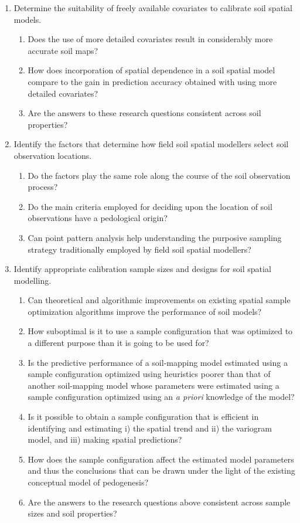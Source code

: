\begin{enumerate}
 \item Determine the suitability of freely available covariates to calibrate soil spatial models.
  \begin{enumerate}[label=(\alph*)]
   \item Does the use of more detailed covariates result in considerably more accurate soil maps?
   \item How does incorporation of spatial dependence in a soil spatial model compare to the gain in 
   prediction accuracy obtained with using more detailed covariates?
   \item Are the answers to these research questions consistent across soil properties?
  \end{enumerate}
 
 \item Identify the factors that determine how field soil spatial modellers select soil observation locations.
  \begin{enumerate}[label=(\alph*)]
   \item Do the factors play the same role along the course of the soil observation process?
   \item Do the main criteria employed for deciding upon the location of soil observations have a pedological 
   origin?
   \item Can point pattern analysis help understanding the purposive sampling strategy traditionally employed
   by field soil spatial modellers?
  \end{enumerate}
 
 \item Identify appropriate calibration sample sizes and designs for soil spatial modelling.
  \begin{enumerate}[label=(\alph*)]
   \item Can theoretical and algorithmic improvements on existing spatial sample optimization algorithms 
   improve the performance of soil models?
   \item How suboptimal is it to use a sample configuration that was optimized to a different purpose than it 
   is going to be used for?
   \item Is the predictive performance of a soil-mapping model estimated using a sample configuration 
   optimized using heuristics poorer than that of another soil-mapping model whose parameters were estimated 
   using a sample configuration optimized using an \textit{a priori} knowledge of the model?
   \item Is it possible to obtain a sample configuration that is efficient in identifying and estimating i) 
   the spatial trend and ii) the variogram model, and iii) making spatial predictions?
   \item How does the sample configuration affect the estimated model parameters and thus the conclusions that 
   can be drawn under the light of the existing conceptual model of pedogenesis?
   \item Are the answers to the research questions above consistent across sample sizes and soil properties?
  \end{enumerate}
\end{enumerate}

